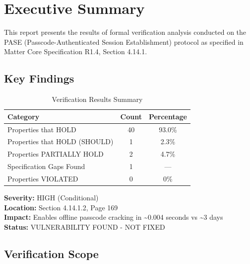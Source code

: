 \documentclass[11pt,a4paper]{article}
\begin{document}
\tableofcontents
\newpage

\section{Executive Summary}

This report presents the results of formal verification analysis conducted on the PASE (Passcode-Authenticated Session Establishment) protocol as specified in Matter Core Specification R1.4, Section 4.14.1.

\subsection{Key Findings}

\begin{table}[H]
\centering
\caption{Verification Results Summary}
\begin{tabular}{|l|c|c|}
\hline
\rowcolor{lightgray}
\textbf{Category} & \textbf{Count} & \textbf{Percentage} \\
\hline
Properties that HOLD & 40 & 93.0\% \\
\hline
Properties that HOLD (SHOULD) & 1 & 2.3\% \\
\hline
\rowcolor{gapyellow!20}
Properties PARTIALLY HOLD & 2 & 4.7\% \\
\hline
\rowcolor{criticalred!20}
Specification Gaps Found & 1 & --- \\
\hline
Properties VIOLATED & 0 & 0\% \\
\hline
\end{tabular}
\end{table}

\begin{gapbox}
\textbf{Severity:} HIGH (Conditional) \\
\textbf{Location:} Section 4.14.1.2, Page 169 \\
\textbf{Impact:} Enables offline passcode cracking in \textasciitilde0.004 seconds vs \textasciitilde3 days \\
\textbf{Status:} \textcolor{criticalred}{VULNERABILITY FOUND - NOT FIXED}
\end{gapbox}

\subsection{Verification Scope}
\end{document}

